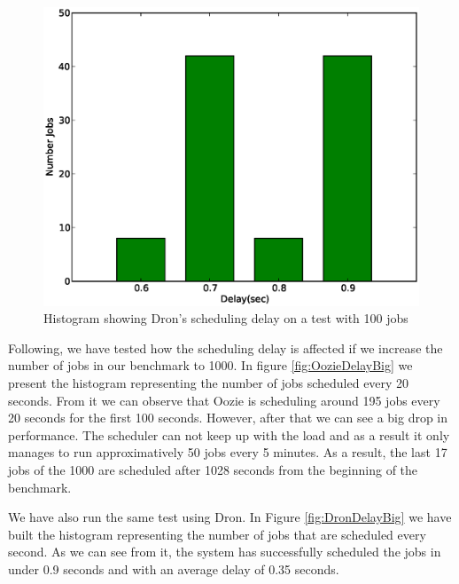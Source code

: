 \documentclass[11pt,a4paper,twoside]{report}
\begin{document}
\begin{figure}[h]
\centering
\includegraphics[scale=0.50]{drondelay}
\caption{Histogram showing Dron's scheduling delay on a test with 100 jobs}
\label{fig:DronDelay}
\end{figure}


Following, we have tested how the scheduling delay is affected if we increase the number of jobs in our benchmark to 1000. In figure \ref{fig:OozieDelayBig} we present the histogram representing the number of jobs scheduled every 20 seconds. From it we can observe that Oozie is scheduling around 195 jobs every 20 seconds for the first 100 seconds. However, after that we can see a big drop in performance. The scheduler can not keep up with the load and as a result it only manages to run approximatively 50 jobs every 5 minutes. As a result, the last 17 jobs of the 1000 are scheduled after 1028 seconds from the beginning of the benchmark.


We have also run the same test using Dron. In Figure \ref{fig:DronDelayBig} we have built the histogram representing the number of jobs that are scheduled every second. As we can see from it, the system has successfully scheduled the jobs in under 0.9 seconds and with an average delay of 0.35 seconds.
\end{document}
